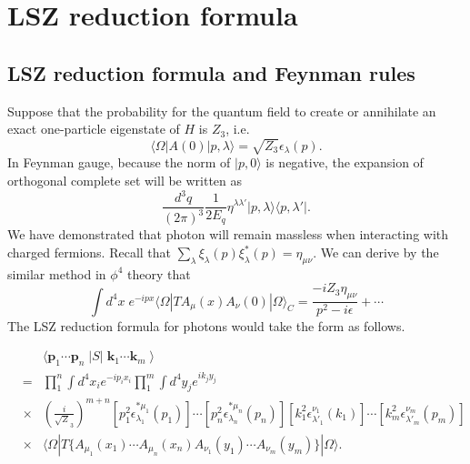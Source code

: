 \section{LSZ reduction formula}
\subsection{LSZ reduction formula and Feynman rules}
\noindent
Suppose that the probability for the quantum field to create or annihilate an exact one-particle eigenstate of $H$ is $Z_3$, i.e.
\[\langle \Omega | A(0) | p,\lambda \rangle = \sqrt{Z_3} \epsilon_{\lambda}(p).\]
In Feynman gauge, because the norm of $|p,0\rangle$ is negative, the expansion of orthogonal complete set will be written as
\[\frac{d^3q}{(2\pi)^3} \frac{1}{2E_q} \eta^{\lambda\lambda'} | p,\lambda\rangle\langle p, \lambda' |.\]
We have demonstrated that photon will remain massless when interacting with charged fermions. Recall that $\sum_{\lambda}\xi_{\lambda}(p)\xi^{*}_{\lambda}(p) = \eta_{\mu\nu}$. 
We can derive by the similar method in $\phi^4$ theory that
\[\int d^4x \; e^{-ipx} \langle \Omega | T A_{\mu}(x) A_{\nu}(0) | \Omega \rangle_C = \frac{-iZ_3\eta_{\mu\nu}}{p^2-i\epsilon} + \cdots \]
The LSZ reduction formula for photons would take the form as follows.

\begin{newthem}
\begin{eqnarray}
&\phantom{=}& \langle \bm{p}_1 \cdots \bm{p}_n \; | S | \; \bm{k}_1 \cdots \bm{k}_m \; \rangle  
\nonumber \\
&=& \prod_1^n \int d^4 x_i e^{-i p_ix_i } \prod_1^m \int d^4 y_j e^{ik_jy_j} 
\nonumber \\
&\times & \left( \frac{i}{\sqrt{Z}_3} \right) ^{m+n}  [p_1^2 \epsilon^{*\mu_1}_{\lambda_1}(p_1)] \cdots [p_n^2 \epsilon^{*\mu_n}_{\lambda_n}(p_n)] [k_1^2 \epsilon^{ \nu_1}_{\lambda'_1}(k_1)] \cdots [k_m^2 \epsilon^{ \nu_m}_{\lambda'_m}(p_m)]
\nonumber \\
&\times & \langle \Omega | T \{A_{\mu_1}(x_1) \cdots A_{\mu_n}(x_n)
A_{\nu_1}(y_1) \cdots A_{\nu_m}(y_m) \} | \Omega \rangle.
\nonumber
\end{eqnarray}
\end{newthem}

